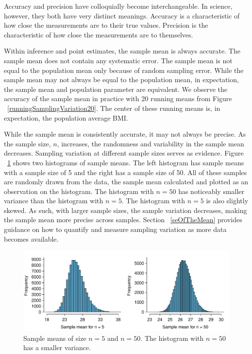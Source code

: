 Accuracy and precision have colloquially become interchangeable. In science, however, they both have very distinct meanings. Accuracy is a characteristic of how close the measurements are to their true values. Precision is the characteristic of how close the measurements are to themselves. 

Within inference and point estimates, the sample mean is always accurate. The sample mean does not contain any systematic error. The sample mean is not equal to the population mean only because of random sampling error. While the sample mean may not always be equal to the population mean, in expectation, the sample mean and population parameter are equivalent. We observe the accuracy of the sample mean in practice with 20 running means from Figure ~\ref{runningSamplingVariation20}. The center of these running means is, in expectation, the population average BMI. 

While the sample mean is consistently accurate, it may not always be precise. As the sample size, $n$, increases, the randomness and variability in the sample mean decreases. Sampling variation at different sample sizes serves as evidence. Figure ~\ref{sampleMeanPrecision} shows two histograms of sample means. The left histogram has sample means with a sample size of 5 and the right has a sample size of 50. All of these samples are randomly drawn from the  data, the sample mean calculated and plotted as an observation on the histogram. The histogram with $n=50$ has noticeably smaller variance than the histogram with $n=5$. The histogram with $n=5$ is also slightly skewed. As such, with larger sample sizes, the sample variation decreases, making the sample mean more precise across samples. Section ~\ref{seOfTheMean} provides guidance on how to quantify and measure sampling variation as more data becomes available. 

\begin{figure}
   \centering
   \includegraphics[width=\textwidth]{ch_inference_foundations_oi_biostat/figures/brfssBMISampleMeanPrecision/brfssBMISampleMeanPrecision}
   \caption{Sample means of size $n=5$ and $n=50$. The histogram with $n=50$ has a smaller variance.}
   \label{sampleMeanPrecision}
\end{figure}
 
